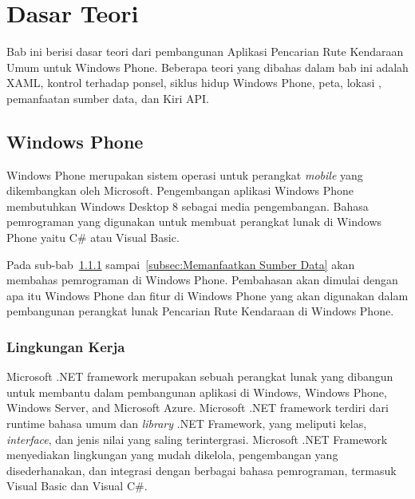 \chapter{Dasar Teori}
\label{chap:teori}
Bab ini berisi dasar teori dari pembangunan Aplikasi Pencarian Rute Kendaraan Umum untuk Windows Phone. Beberapa teori yang dibahas dalam bab ini  adalah XAML, kontrol terhadap ponsel, siklus hidup Windows Phone, peta, lokasi , pemanfaatan sumber data, dan Kiri API. 

\section{Windows Phone}
\label{sec:Windows Phone}
\hspace{0.5cm} Windows Phone merupakan sistem operasi untuk perangkat \textit{mobile} yang dikembangkan oleh Microsoft. Pengembangan aplikasi Windows Phone membutuhkan Windows Desktop 8 sebagai media pengembangan. Bahasa pemrograman yang digunakan untuk membuat perangkat lunak di Windows Phone yaitu C\# atau Visual Basic\cite{Manning}.  

Pada sub-bab~\ref{subsec:Lingkungan Kerja} sampai~\ref{subsec:Memanfaatkan Sumber Data} akan membahas pemrograman di Windows Phone. Pembahasan akan dimulai dengan apa itu Windows Phone dan fitur di Windows Phone yang akan digunakan dalam pembangunan perangkat lunak Pencarian Rute Kendaraan di Windows Phone. 

\subsection{Lingkungan Kerja}
\label{subsec:Lingkungan Kerja}
\hspace{0.5cm} Microsoft .NET framework merupakan sebuah perangkat lunak yang dibangun untuk membantu dalam pembangunan aplikasi di Windows, Windows Phone, Windows Server, and Microsoft Azure\cite{MSDN}. Microsoft .NET framework terdiri dari runtime bahasa umum dan \textit{library} .NET Framework, yang meliputi kelas, \textit{interface}, dan jenis nilai yang saling terintergrasi. Microsoft .NET Framework menyediakan lingkungan yang mudah dikelola, pengembangan yang disederhanakan, dan integrasi dengan berbagai bahasa pemrograman, termasuk Visual Basic dan Visual C\#.

